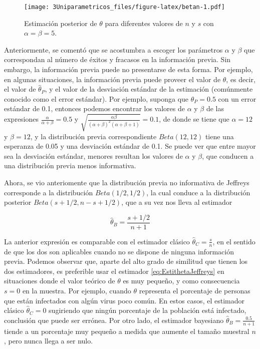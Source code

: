 \documentclass[
  12pt,
  spanish,
]{book}
\theoremstyle{definition}
\theoremstyle{definition}
\theoremstyle{definition}
\theoremstyle{definition}
\theoremstyle{remark}
\begin{document}
\begin{figure}
\centering
\texttt{[image: 3Uniparametricos\_files/figure-latex/betan-1.pdf]}
\caption{\label{fig:betan}Estimación posterior de \(\theta\) para diferentes valores de \(n\) y \(s\) con \(\alpha=\beta=5\).}
\end{figure}

Anteriormente, se comentó que se acostumbra a escoger los parámetros
\(\alpha\) y \(\beta\) que correspondan al número de éxitos y fracasos en la
información previa. Sin embargo, la información previa puede no
presentarse de esta forma. Por ejemplo, en algunas situaciones, la
información previa puede proveer el valor de \(\theta\), es decir, el
valor de \(\hat{\theta}_P\), y el valor de la desviación estándar de la
estimación (comúnmente conocido como el error estándar). Por ejemplo,
suponga que \(\hat{\theta}_P=0.5\) con un error estándar de 0.1, entonces
podemos encontrar los valores de \(\alpha\) y \(\beta\) de las expresiones
\(\frac{\alpha}{\alpha+\beta}=0.5\) y
\(\sqrt{\frac{\alpha\beta}{(\alpha+\beta)^2(\alpha+\beta+1)}}=0.1\), de
donde se tiene que \(\alpha=12\) y \(\beta=12\), y la distribución previa
correspondiente \(Beta(12, 12)\) tiene una esperanza de 0.05 y una
desviación estándar de 0.1. Se puede ver que entre mayor sea la
desviación estándar, menores resultan los valores de \(\alpha\) y \(\beta\),
que conducen a una distribución previa menos informativa.

Ahora, se vio anteriomente que la distribución previa no informativa de
Jeffreys corresponde a la distribución \(Beta(1/2, 1/2)\), la cual conduce
a la distribución posterior \(Beta(s+1/2, n-s+1/2)\), que a su vez nos
lleva al estimador

\begin{equation}
\label{eq:EstithetaJeffreys}
\hat{\theta}_B=\frac{s+1/2}{n+1}
\end{equation}

La anterior expresión es comparable con el estimador clásico
\(\hat{\theta}_C=\frac{s}{n}\), en el sentido de que los dos son
aplicables cuando no se dispone de ninguna información previa. Podemos
observar que, aparte del alto grado de similitud que tienen los dos
estimadores, es preferible usar el estimador \eqref{eq:EstithetaJeffreys} en situaciones donde el valor teórico de \(\theta\) es muy pequeño, y
como consecuencia \(s=0\) en la muestra. Por ejemplo, cuando \(\theta\)
representa el porcentaje de personas que están infectados con algún
virus poco común. En estos casos, el estimador clásico
\(\hat{\theta}_C=0\) sugiriendo que ningún porcentaje de la población está
infectado, conclusión que puede ser errónea. Por otro lado, el estimador
bayesiano \(\hat{\theta}_B=\frac{0.5}{n+1}\) tiende a un porcentaje muy pequeño a medida que aumente el tamaño muestral \(n\),
pero nunca llega a ser nulo.
\end{document}
